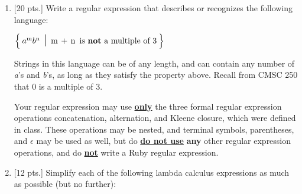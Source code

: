 \documentclass[11pt]{article}
\begin{document}
\begin{enumerate}
          \smallskip


          \pagebreak


    \item {[20 pts.]} Write a regular expression that describes or
          recognizes the following language:

          \vspace{-.5mm}

          \begin{centering}

            \(
              \left\{
                \:
                {a^\mathrm{m}}{b^\mathrm{n}}
                \mbox{\Large \ensuremath{\ \mid \ }}
                \mathrm{m \, + \, n \ \, \textrm{is \textbf{not} a multiple
                        of 3}
                }
                \:
              \right\}
            \)

          \end{centering}

          Strings in this language can be of any length, and can contain any
          number of \emph{a}'s and \emph{b}'s, as long as they satisfy the
          property above.  Recall from CMSC 250 that 0 is a multiple of 3.

          Your regular expression may use \textbf{\underline{only}} the
          three formal regular expression operations concatenation,
          alternation, and Kleene closure, which were defined in class.
          These operations may be nested, and terminal symbols, parentheses,
          and $\epsilon$ may be used as well, but do \textbf{\underline{do
          not use}} \textbf{any} other regular expression operations,
          and do \textbf{\underline{not}} write a Ruby regular expression.

          \vspace{4in}


    \item {[12 pts.]} Simplify each of the following lambda calculus
          expressions as much as possible (but no further):

          \bigskip\bigskip

          \begin{enumerate}


\end{enumerate}
\end{enumerate}
\end{document}
